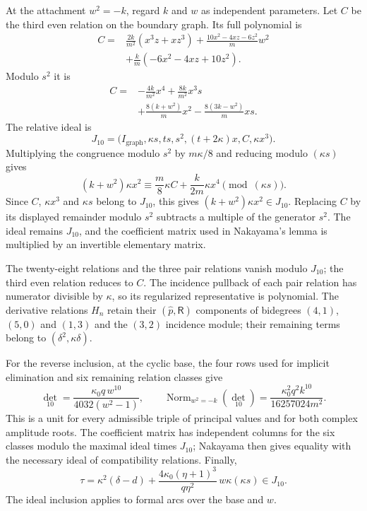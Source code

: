\documentclass[11pt,a4paper]{article}
\numberwithin{equation}{section}
\theoremstyle{plain}
\theoremstyle{definition}
\theoremstyle{remark}
\begin{document}
At the attachment $w^2=-k$, regard $k$ and $w$ as independent parameters. Let $C$ be the third even relation on the boundary graph. Its full
polynomial is
\[
 \begin{aligned}
 C={}&\frac{2k}{m^2}(x^3z+xz^3)
       +\frac{10x^2-4xz-6z^2}{m}w^2\\
     &+\frac{k}{m}(-6x^2-4xz+10z^2).
 \end{aligned}
\]
Modulo $s^2$ it is
\[
\begin{aligned}
 C={}&-\frac{4k}{m^2}x^4+\frac{8k}{m^2}x^3s\\
    &+\frac{8(k+w^2)}m x^2-\frac{8(3k-w^2)}m xs.
\end{aligned}
\]
The relative ideal is
\[
 J_{10}=\bigl(I_{\mathrm{graph}},\kappa s,ts,s^2,(t+2\kappa)x,
                         C,\kappa x^3\bigr).
\]
Multiplying the congruence modulo $s^2$ by $m\kappa/8$ and
reducing modulo $(\kappa s)$ gives
\[
 (k+w^2)\kappa x^2\equiv\frac m8\kappa C
       +\frac{k}{2m}\kappa x^4\pmod{(\kappa s)}.
\]
Since $C$, $\kappa x^3$ and $\kappa s$ belong to $J_{10}$,
this gives $(k+w^2)\kappa x^2\in J_{10}$.
Replacing $C$ by its displayed remainder modulo $s^2$ subtracts a
multiple of the generator $s^2$. The ideal remains $J_{10}$, and the
coefficient matrix used in Nakayama's lemma is multiplied by an
invertible elementary matrix.

The twenty-eight relations and the three pair relations vanish
modulo $J_{10}$; the third even relation reduces to $C$. The incidence pullback of each pair relation has numerator divisible
by $\kappa$, so its regularized representative is polynomial.
The derivative relations $H_n$ retain their $(\widehat p,\mathsf R)$ components of bidegrees
$(4,1)$, $(5,0)$ and $(1,3)$ and the $(3,2)$ incidence module;
their remaining terms belong to $(\delta^2,\kappa\delta)$.

For the reverse inclusion, at the cyclic base, the four rows used for implicit elimination and six remaining relation classes give
\[
 \det_{10}=\frac{\kappa_0 q\,w^{10}}{4032(w^2-1)},\qquad
 \operatorname{Norm}_{w^2=-k}(\det_{10})
 =\frac{\kappa_0 ^2q^2k^{10}}{16257024m^2}.
\]
This is a unit for every admissible triple of principal values and for both complex
amplitude roots. The coefficient matrix has independent columns for
the six classes modulo the maximal ideal times $J_{10}$; Nakayama
then gives equality with the necessary ideal of compatibility relations. Finally,
\[
 \tau=\kappa^2(\delta-d)
       +\frac{4\kappa_0 (\eta +1)^3}{q\eta ^2}\,w\kappa(\kappa s)\in J_{10}.
\]
The ideal inclusion applies to formal arcs over the base and $w$.
\end{document}
